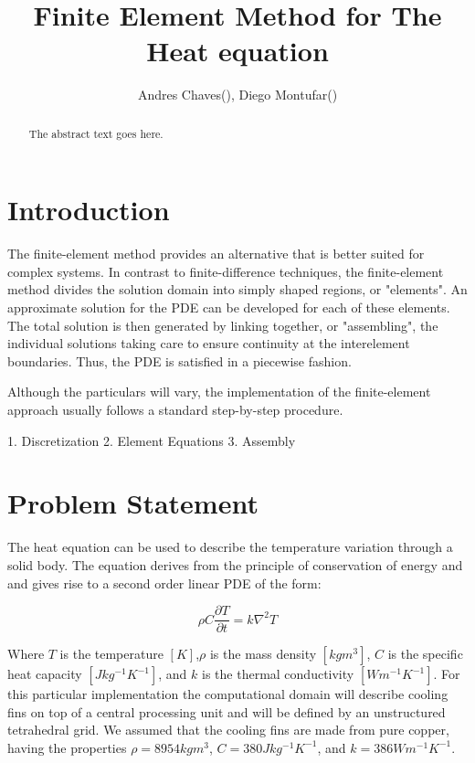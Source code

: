 \documentclass[12pt]{article}
\begin{document}
	
	
	\title{Finite Element Method for The Heat equation}
	\author{Andres Chaves(), Diego Montufar()}
	
	\maketitle
	
	\begin{abstract}
		The abstract text goes here.
	\end{abstract}
	
	\section{Introduction}
	
	The finite-element method provides an alternative that is better suited for complex systems.
In contrast to finite-difference techniques, the finite-element method divides the solution domain into simply shaped regions, or "elements". An approximate solution for the PDE can be developed for each of these elements. The total solution is then generated by linking together, or "assembling", the individual solutions taking care to ensure continuity at the interelement boundaries. Thus, the PDE is satisfied in a piecewise fashion.

Although the particulars will vary, the implementation of the finite-element approach usually follows a standard step-by-step procedure.

1. Discretization
2. Element Equations
3. Assembly
	
	
	\section{Problem Statement}
	
The heat equation can be used to describe the temperature variation through a
solid body. The equation derives from the principle of conservation of energy and
and gives rise to a second order linear PDE of the form:
	
	\begin{equation}
		\rho C \frac{\partial T}{\partial t} = k \nabla^2 T
	\end{equation}
	
Where $T$ is the temperature $[K]$,$\rho$ is the mass density $[kgm^3]$, $C$ is the specific heat capacity $[Jkg^{-1}K^{-1}]$, and $k$ is the thermal conductivity $[Wm^{-1}K^{-1}]$. For this particular implementation the computational domain will describe cooling fins on top of a central processing unit
and will be defined by an unstructured tetrahedral grid. We assumed that the cooling fins are made from pure copper, having the properties $\rho = 8954kgm^3$, $C = 380Jkg^{-1}K^{-1}$, and $k = 386Wm^{-1}K^{-1}$. 
\end{document}

